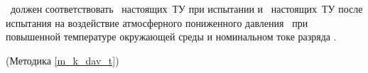 \dut \ должен соответствовать \treb \ настоящих~ТУ при испытании и \trebafter \ настоящих~ТУ после испытания на воздействие атмосферного пониженного давления \kdav \ при повышенной температуре окружающей среды и номинальном токе разряда \currentdav.

\begin{flushright}
	(Методика \ref{m_k_dav_t})
\end{flushright}

